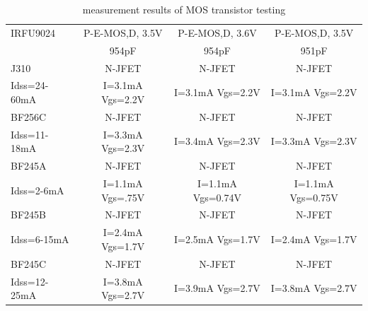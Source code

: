 \begin{table}[H]
\begin{center}
\begin{tabular}{| l | c | c | c |}
    \hline
IRFU9024     & P-E-MOS,D, 3.5V  & P-E-MOS,D, 3.6V  & P-E-MOS,D, 3.5V \\
             & 954pF            & 954pF            & 951pF \\
    \hline
J310         & N-JFET           & N-JFET           & N-JFET\\
Idss=24-60mA & I=3.1mA Vgs=2.2V & I=3.1mA Vgs=2.2V & I=3.1mA Vgs=2.2V \\
    \hline
BF256C       & N-JFET           & N-JFET           & N-JFET\\
Idss=11-18mA & I=3.3mA Vgs=2.3V & I=3.4mA Vgs=2.3V & I=3.3mA Vgs=2.3V \\
    \hline
BF245A       & N-JFET           & N-JFET           & N-JFET\\
Idss=2-6mA   & I=1.1mA Vgs=.75V & I=1.1mA Vgs=0.74V & I=1.1mA Vgs=0.75V \\
    \hline
BF245B       & N-JFET           & N-JFET           & N-JFET\\
Idss=6-15mA  & I=2.4mA Vgs=1.7V & I=2.5mA Vgs=1.7V & I=2.4mA Vgs=1.7V \\
    \hline
BF245C       & N-JFET           & N-JFET           & N-JFET\\
Idss=12-25mA & I=3.8mA Vgs=2.7V & I=3.9mA Vgs=2.7V & I=3.8mA Vgs=2.7V \\
    \hline
    \end{tabular}
  \end{center}
  \caption{measurement results of MOS transistor testing}
  \label{tab:mos} 
\end{table}
